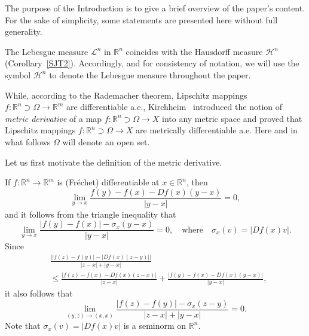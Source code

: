 \documentclass[12pt,leqno]{amsart}
\theoremstyle{definition}
\newcommand{\bbbr}{\mathbb R}
\def\H{{\mathcal H}}
\def\LL{{\mathcal L}}
\numberwithin{theorem}{section} \numberwithin{equation}{section}
\begin{document}
The purpose of the Introduction is to give a brief overview of the paper’s content. For the sake of simplicity, some statements are presented here without full generality.

The Lebesgue measure $\LL^n$ in $\bbbr^n$ coincides with the Hausdorff measure $\H^n$ (Corollary~\ref{SJT2}). Accordingly, and for consistency of notation, we will use the symbol $\H^n$ to denote the Lebesgue measure throughout the paper.

While, according to the Rademacher theorem, Lipschitz mappings $f:\bbbr^n\supset\Omega\to \bbbr^m$ are differentiable a.e., Kirchheim~\cite{kir} introduced the notion of {\em metric derivative} of a map $f:\bbbr^n\supset\Omega\to X$ into any metric space and proved that Lipschitz mappings $f:\bbbr^n\supset\Omega\to X$ are metrically differentiable a.e. Here and in what follows $\Omega$ will denote an open set.

Let us first motivate the definition of the metric derivative.

If $f\colon \bbbr^n\to\bbbr^m$ is (Fr\'echet) differentiable at $x\in\bbbr^n$, then
$$
\lim_{y\to x}\frac{f(y)-f(x)-Df(x)(y-x)}{|y-x|}=0,
$$
and it follows from the triangle inequality that
$$
\lim_{y\to x} \frac{|f(y)-f(x)|-\sigma_x(y-x)}{|y-x|}=0,
\quad
\text{where}
\quad
\sigma_x(v)=|Df(x)v|.
$$
Since
\[
\begin{split}
& \frac{\big||f(z)-f(y)|-|Df(x)(z-y)|\big|}{|z-x|+|y-x|}\\
&\leq
\frac{|f(z)-f(x)-Df(x)(z-x)|}{|z-x|}+
\frac{|f(y)-f(x)-Df(x)(y-x)|}{|y-x|},
\end{split}
\]
it also follows that
$$
\lim_{(y,z)\to (x,x)}\frac{|f(z)-f(y)|-\sigma_x(z-y)}{|z-x|+|y-x|}=0.
$$
Note that $\sigma_x(v)=|Df(x)v|$ is a seminorm on $\bbbr^n$.
\end{document}
